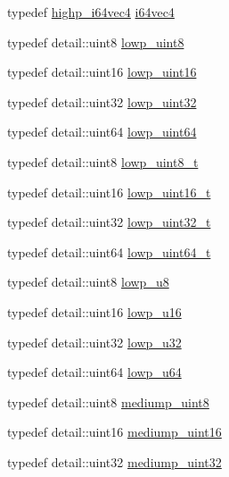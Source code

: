 \begin{CompactItemize}
\item 
typedef \hyperlink{group__gtc__type__precision_g0ea279cd954fbb71a1db62e897d4d7f5}{highp\_\-i64vec4} \hyperlink{group__gtc__type__precision_g19846034cab6ee6e031884ea30def7fc}{i64vec4}
\item 
typedef detail::uint8 \hyperlink{group__gtc__type__precision_g4d9dc08b7b248a386dfe9afd00fc6b1e}{lowp\_\-uint8}
\item 
typedef detail::uint16 \hyperlink{group__gtc__type__precision_g9b8409887319f62f06e664f6ca121b9d}{lowp\_\-uint16}
\item 
typedef detail::uint32 \hyperlink{group__gtc__type__precision_gf11e85af414720b4cd12bd57b3a81e68}{lowp\_\-uint32}
\item 
typedef detail::uint64 \hyperlink{group__gtc__type__precision_gcf666a9d9b309c4615c7a4f2ab0be289}{lowp\_\-uint64}
\item 
typedef detail::uint8 \hyperlink{group__gtc__type__precision_g0910ef24195d1b8b26e34d73148c0c45}{lowp\_\-uint8\_\-t}
\item 
typedef detail::uint16 \hyperlink{group__gtc__type__precision_g9a71176a4e5bc61951f9e9197d9c80e1}{lowp\_\-uint16\_\-t}
\item 
typedef detail::uint32 \hyperlink{group__gtc__type__precision_g9f8cb602a358e1f48bda2682cf051f0c}{lowp\_\-uint32\_\-t}
\item 
typedef detail::uint64 \hyperlink{group__gtc__type__precision_gbf3069d4f188557a87b1d7f35eb0a270}{lowp\_\-uint64\_\-t}
\item 
typedef detail::uint8 \hyperlink{group__gtc__type__precision_ge63f942c49a30dbf266b2f13f3efe257}{lowp\_\-u8}
\item 
typedef detail::uint16 \hyperlink{group__gtc__type__precision_g22c5364f27caa0a6eb0627cbc21e46be}{lowp\_\-u16}
\item 
typedef detail::uint32 \hyperlink{group__gtc__type__precision_gba06fae1dd98ca50c017e68345df0365}{lowp\_\-u32}
\item 
typedef detail::uint64 \hyperlink{group__gtc__type__precision_g61ed4c68a4cffb77cd63cc107119123a}{lowp\_\-u64}
\item 
typedef detail::uint8 \hyperlink{group__gtc__type__precision_gc4b849eaac0543a10f97f4bdda4850a8}{mediump\_\-uint8}
\item 
typedef detail::uint16 \hyperlink{group__gtc__type__precision_g2cef3a0d7b0fce75c9885f64656d8933}{mediump\_\-uint16}
\item 
typedef detail::uint32 \hyperlink{group__gtc__type__precision_g861dbd1051f488e425b3966001b568e5}{mediump\_\-uint32}

\end{CompactItemize}
